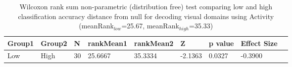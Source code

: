 \begin{table}
\centering
\begin{tabular}[0.2em]{@{}lllllllll@{}}\toprule
Group1 & Group2 & N & rankMean1 & rankMean2 & Z & p value & Effect Size\\\toprule[0.2em]
Low & High & 30 & 25.6667 & 35.3334 & -2.1363 & 0.0327 & -0.3900 \\\bottomrule[0.2em]
\end{tabular}
\caption{Wilcoxon rank sum non-parametric (distribution free) test comparing low and high classification accuracy distance from null for decoding visual domains using Activity (meanRank$_{low}$=25.67, meanRank$_{high}$=35.33)\label{tabel:null}}
\end{table}
